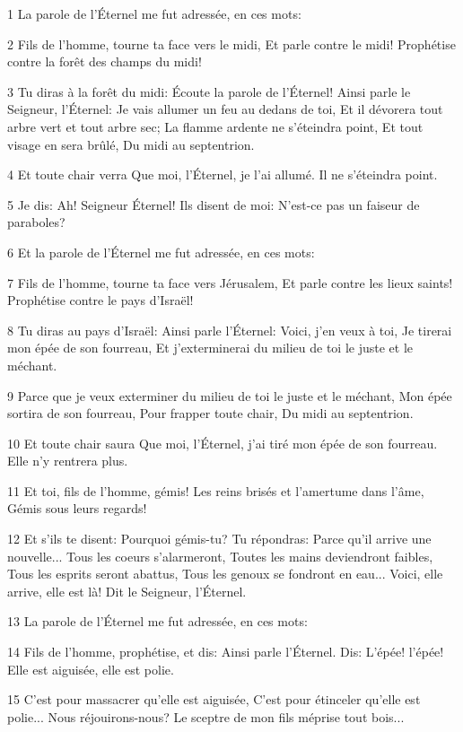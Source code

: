 \par 1 La parole de l'Éternel me fut adressée, en ces mots:
\par 2 Fils de l'homme, tourne ta face vers le midi, Et parle contre le midi! Prophétise contre la forêt des champs du midi!
\par 3 Tu diras à la forêt du midi: Écoute la parole de l'Éternel! Ainsi parle le Seigneur, l'Éternel: Je vais allumer un feu au dedans de toi, Et il dévorera tout arbre vert et tout arbre sec; La flamme ardente ne s'éteindra point, Et tout visage en sera brûlé, Du midi au septentrion.
\par 4 Et toute chair verra Que moi, l'Éternel, je l'ai allumé. Il ne s'éteindra point.
\par 5 Je dis: Ah! Seigneur Éternel! Ils disent de moi: N'est-ce pas un faiseur de paraboles?
\par 6 Et la parole de l'Éternel me fut adressée, en ces mots:
\par 7 Fils de l'homme, tourne ta face vers Jérusalem, Et parle contre les lieux saints! Prophétise contre le pays d'Israël!
\par 8 Tu diras au pays d'Israël: Ainsi parle l'Éternel: Voici, j'en veux à toi, Je tirerai mon épée de son fourreau, Et j'exterminerai du milieu de toi le juste et le méchant.
\par 9 Parce que je veux exterminer du milieu de toi le juste et le méchant, Mon épée sortira de son fourreau, Pour frapper toute chair, Du midi au septentrion.
\par 10 Et toute chair saura Que moi, l'Éternel, j'ai tiré mon épée de son fourreau. Elle n'y rentrera plus.
\par 11 Et toi, fils de l'homme, gémis! Les reins brisés et l'amertume dans l'âme, Gémis sous leurs regards!
\par 12 Et s'ils te disent: Pourquoi gémis-tu? Tu répondras: Parce qu'il arrive une nouvelle... Tous les coeurs s'alarmeront, Toutes les mains deviendront faibles, Tous les esprits seront abattus, Tous les genoux se fondront en eau... Voici, elle arrive, elle est là! Dit le Seigneur, l'Éternel.
\par 13 La parole de l'Éternel me fut adressée, en ces mots:
\par 14 Fils de l'homme, prophétise, et dis: Ainsi parle l'Éternel. Dis: L'épée! l'épée! Elle est aiguisée, elle est polie.
\par 15 C'est pour massacrer qu'elle est aiguisée, C'est pour étinceler qu'elle est polie... Nous réjouirons-nous? Le sceptre de mon fils méprise tout bois...
